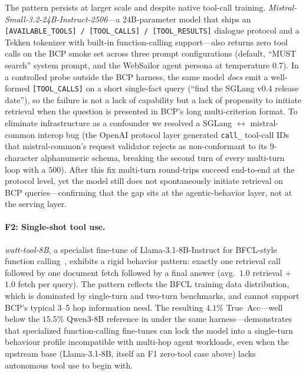 \documentclass[11pt]{article}
\begin{document}
The pattern persists at larger scale and despite native tool-call
training. \textit{Mistral-Small-3.2-24B-Instruct-2506}---a
24B-parameter model that ships an
\texttt{[AVAILABLE\_TOOLS] / [TOOL\_CALLS] / [TOOL\_RESULTS]} dialogue
protocol and a Tekken tokenizer with built-in function-calling
support---also returns zero tool calls on the BCP smoke set across
three prompt configurations (default, ``MUST search'' system prompt,
and the WebSailor agent persona at temperature $0.7$). In a controlled
probe outside the BCP harness, the same model \emph{does} emit a
well-formed \texttt{[TOOL\_CALLS]} on a short single-fact query
(``find the SGLang v0.4 release date''), so the failure is not a lack
of capability but a lack of propensity to initiate retrieval when the
question is presented in BCP's long multi-criterion format. To
eliminate infrastructure as a confounder we resolved a SGLang
$\leftrightarrow$ mistral-common interop bug (the OpenAI protocol
layer generated \texttt{call\_<24hex>} tool-call IDs that
mistral-common's request validator rejects as non-conformant to its
9-character alphanumeric schema, breaking the second turn of every
multi-turn loop with a $500$). After this fix multi-turn round-trips
succeed end-to-end at the protocol level, yet the model still does not
spontaneously initiate retrieval on BCP queries---confirming that the
gap sits at the agentic-behavior layer, not at the serving layer.

\paragraph{F2: Single-shot tool use.}
\textit{watt-tool-8B}, a specialist fine-tune of
Llama-3.1-8B-Instruct for BFCL-style function
calling~\citep{patil2025berkeley}, exhibits a rigid behavior pattern:
exactly one retrieval call followed by one document fetch followed by
a final answer (avg.\ $1.0$ retrieval + $1.0$ fetch per query). The
pattern reflects the BFCL training data distribution, which is
dominated by single-turn and two-turn benchmarks, and cannot support
BCP's typical 3--5 hop information need. The resulting $4.1\%$
True~Acc—well below the $15.5\%$ Qwen3-8B reference in
 under the same harness—demonstrates
that specialized function-calling fine-tunes can lock the model
into a single-turn behaviour profile incompatible with multi-hop
agent workloads, even when the upstream base (Llama-3.1-8B,
itself an F1 zero-tool case above) lacks autonomous tool use to
begin with.
\end{document}
